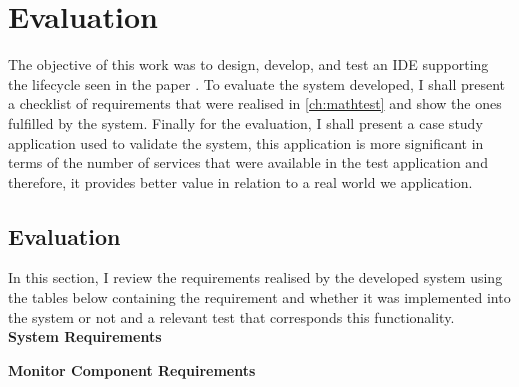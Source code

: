 \chapter{Evaluation}\label{ch:evaluation}
The objective of this work was to design, develop, and test an IDE supporting the lifecycle seen in the paper \cite{andrikopoulos2017engineering}. To evaluate the system developed, I shall present a checklist of requirements that were realised in \autoref{ch:mathtest} and show the ones fulfilled by the system.  Finally for the evaluation, I shall present a case study application used to validate the system, this application is more significant in terms of the number of services that were available in the test application and therefore, it provides better value in relation to a real world we application.

\section{Evaluation}
In this section, I review the requirements realised by the developed system using the tables below containing the requirement and whether it was implemented into the system or not and a relevant test that corresponds this functionality.\\
\textbf{System Requirements}
\begin{table}[H]
\caption{System Functional Requirements evaluation}
\label{my-label1}
\end{table}

\textbf{Monitor Component Requirements}
\begin{table}[H]
\caption{Monitor Component Functional Requirements evaluation}
\label{my-label2}
\end{table}

